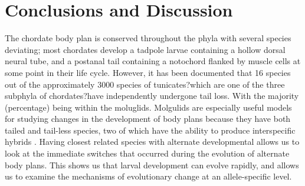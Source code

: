 \chapter{Conclusions and Discussion}
The chordate body plan is conserved throughout the phyla with several species deviating; most chordates develop a tadpole larvae containing a hollow dorsal neural tube, and a postanal tail containing a notochord flanked by muscle cells at some point in their life cycle. However, it has been documented that 16 species out of the approximately 3000 species of tunicates?which are one of the three subphyla of chordates?have independently undergone tail loss. With the majority (percentage) being within the moluglids.%
Molgulids are especially useful models for studying changes in the development of body plans because they have both tailed and tail-less species, two of which have the ability to produce interspecific hybrids \cite{swalla_interspecific_1990}. Having closest related species with alternate developmental allows us to look at the immediate switches that occurred during the evolution of alternate body plans. This shows us that larval development can evolve rapidly, and allows us to examine the mechanisms of evolutionary change at an allele-specific level.

